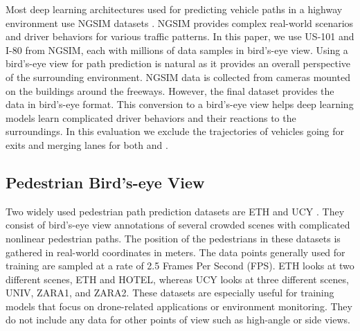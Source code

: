 \documentclass[sigconf]{acmart}
\begin{document}
Most deep learning architectures used for predicting vehicle paths in a highway environment \cite{CSlstm18, highway2022, congestion2021} use NGSIM datasets \cite{NGSIM_i80, NGSIM_US101}. NGSIM provides complex real-world scenarios and driver behaviors for various traffic patterns. In this paper, we use US-101 \cite{NGSIM_US101} and I-80 \cite{NGSIM_i80} from NGSIM, each with millions of data samples in bird's-eye view. Using a bird's-eye view for path prediction is natural as it provides an overall perspective of the surrounding environment. NGSIM data is collected from cameras mounted on the buildings around the freeways. However, the final dataset provides the data in bird's-eye format. This conversion to a bird's-eye view helps deep learning models learn complicated driver behaviors and their reactions to the surroundings. In this evaluation we exclude the trajectories of vehicles going for exits and merging lanes for both \cite{NGSIM_i80} and \cite{NGSIM_US101}.



\subsection{Pedestrian Bird's-eye View}
Two widely used pedestrian path prediction datasets are ETH \cite{pellegrini2009you} and UCY \cite{lerner2007crowds}. They consist of bird's-eye view annotations of several crowded scenes with complicated nonlinear pedestrian paths. The position of the pedestrians in these datasets is gathered in real-world coordinates in meters. The data points generally used for training are sampled at a rate of 2.5 Frames Per Second (FPS). ETH looks at two different scenes, ETH and HOTEL, whereas UCY looks at three different scenes, UNIV, ZARA1, and ZARA2. These datasets are especially useful for training models that focus on drone-related applications or environment monitoring. They do not include any data for other points of view such as high-angle or side views.
\end{document}
